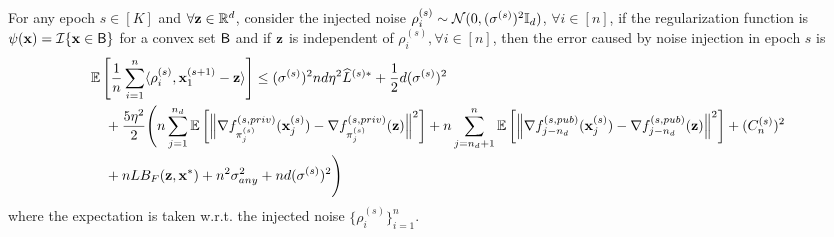 \begin{lemma}
\label{lemma:noise_bias_proj_op}
    For any epoch $s\in [K]$ and $\forall {\mathbf{z}} \in \mathbb{R}^{d}$, consider the injected noise $\rho_{i}^{(s)} \sim {\mathcal{N}}(0, (\sigma^{(s)})^2 {\mathbb{I}}_d)$, $\forall i\in [n]$, if the regularization function is $\psi({\mathbf{x}}) = {\mathcal{I}}\{{\mathbf{x}} \in {\mathsf{B}}\}$ for a convex set ${\mathsf{B}}$ and if ${\mathbf{z}}$ is independent of $\rho_i^{(s)}, \forall i\in [n]$, then the error caused by noise injection in epoch $s$ is
    \begin{align}
    &\mathbb{E}\left[\frac{1}{n}\sum_{i=1}^{n} \langle \rho_i^{(s)}, {\mathbf{x}}_1^{(s+1)} - {\mathbf{z}} \rangle \right] 
    \leq (\sigma^{(s)})^2 nd \eta^2 \widehat{L}^{(s)*}
    + \frac{1}{2}d (\sigma^{(s)})^2\\
    \nonumber
    &\quad + \frac{5\eta^2}{2} \Bigg(
        n\sum_{j=1}^{n_d} \mathbb{E}\left[\Big\| \nabla f_{\pi_j^{(s)}}^{(s,priv)}({\mathbf{x}}_j^{(s)}) - \nabla f_{\pi_j^{(s)}}^{(s,priv)}({\mathbf{z}})\Big\|^2\right]
        + n \sum_{j=n_d+1}^{n} \mathbb{E}\left[\Big\| \nabla f_{j-n_d}^{(s,pub)}({\mathbf{x}}_j^{(s)})
        - \nabla f_{j-n_d}^{(s,pub)}({\mathbf{z}})
        \Big\|^2 \right]
        + (C_n^{(s)})^2\\
    \nonumber
    &\quad + n L B_F({\mathbf{z}}, {\mathbf{x}}^*) + n^2 \sigma_{any}^2 + n d (\sigma^{(s)})^2
    \Bigg)
\end{align}
    where the expectation is taken w.r.t. the injected noise $\{\rho_i^{(s)}\}_{i=1}^{n}$.
\end{lemma}


